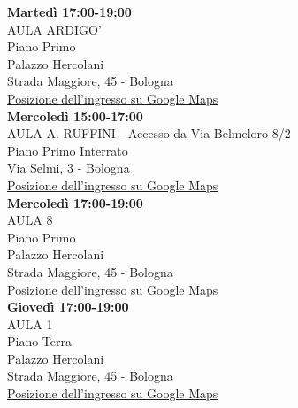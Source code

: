 \documentclass[11pt, a4paper]{article}
\begin{document}
\customsection{\textcolor{red}{Aggiornamento sulle aule per le lezioni}}

\noindent
\textbf{Marted\`{i} 17:00-19:00}\\
AULA ARDIGO'\\
Piano Primo\\
Palazzo Hercolani\\ 
Strada Maggiore, 45 - Bologna \\
\href{https://goo.gl/maps/aVonfPV63NTkrmvm8}{Posizione dell'ingresso su Google Maps}\\

\noindent
\textbf{Mercoled\`{i} 15:00-17:00}\\
AULA A. RUFFINI - Accesso da Via Belmeloro 8/2 \\
Piano Primo Interrato \\
Via Selmi, 3 - Bologna \\
\href{https://goo.gl/maps/iqA6NbC71YwRTXKj6}{Posizione dell'ingresso su Google Maps}\\

\noindent
\textbf{Mercoled\`{i} 17:00-19:00}\\
AULA 8 \\
Piano Primo\\ 
Palazzo Hercolani \\
Strada Maggiore, 45 - Bologna \\
\href{https://goo.gl/maps/aVonfPV63NTkrmvm8}{Posizione dell'ingresso su Google Maps}\\

\noindent
\textbf{Gioved\`{i} 17:00-19:00}\\
AULA 1 \\
Piano Terra \\ 
Palazzo Hercolani \\ 
Strada Maggiore, 45 - Bologna \\\href{https://goo.gl/maps/aVonfPV63NTkrmvm8}{Posizione dell'ingresso su Google Maps}



\setcounter{lezione}{0}
\addtocounter{lezione}{1}
\end{document}
